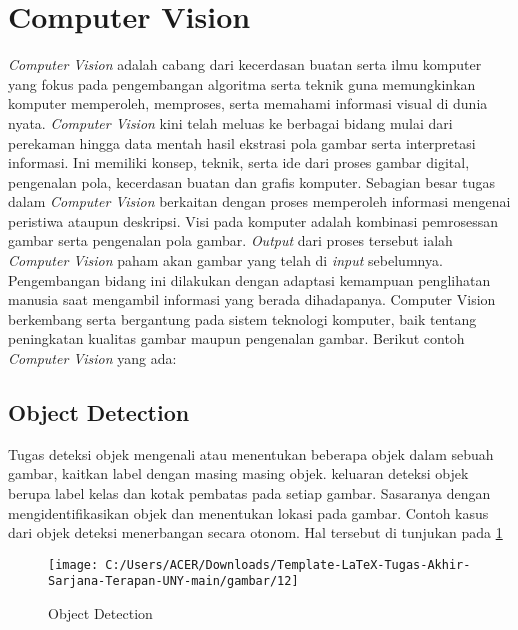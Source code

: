 \section{Computer Vision}
\textit{Computer Vision} adalah cabang dari kecerdasan buatan serta ilmu komputer yang fokus pada pengembangan algoritma serta teknik guna memungkinkan komputer memperoleh, memproses, serta memahami informasi visual di dunia nyata\cite{dipura2024teknologi}. \textit{Computer Vision} kini telah meluas ke berbagai bidang mulai dari perekaman hingga data mentah hasil ekstrasi pola gambar serta interpretasi informasi. Ini memiliki konsep, teknik, serta ide dari proses gambar digital, pengenalan pola, kecerdasan buatan dan grafis komputer. Sebagian besar tugas dalam \textit{Computer Vision} berkaitan dengan proses memperoleh informasi mengenai peristiwa ataupun deskripsi. Visi pada komputer adalah kombinasi pemrosessan gambar serta pengenalan pola gambar. \textit{Output} dari proses tersebut ialah \textit{Computer Vision} paham akan gambar yang telah di \textit{input} sebelumnya. Pengembangan bidang ini dilakukan dengan adaptasi kemampuan penglihatan manusia saat mengambil informasi yang berada dihadapanya.  Computer Vision berkembang serta bergantung pada sistem teknologi komputer, baik tentang peningkatan kualitas gambar maupun pengenalan gambar. Berikut contoh \textit{Computer Vision} yang ada:

\subsection{Object Detection}
Tugas deteksi objek mengenali atau menentukan beberapa objek dalam sebuah gambar, kaitkan label dengan masing masing objek. keluaran deteksi objek berupa label kelas dan kotak pembatas pada setiap gambar. Sasaranya dengan mengidentifikasikan objek dan menentukan lokasi pada gambar. Contoh kasus dari objek deteksi menerbangan secara otonom. Hal tersebut di tunjukan pada \cref{fig:12}

\begin{figure}[H]
	\centering
	\texttt{[image: C:/Users/ACER/Downloads/Template-LaTeX-Tugas-Akhir-Sarjana-Terapan-UNY-main/gambar/12]}
	\caption{Object Detection}
	\label{fig:12}
\end{figure}

